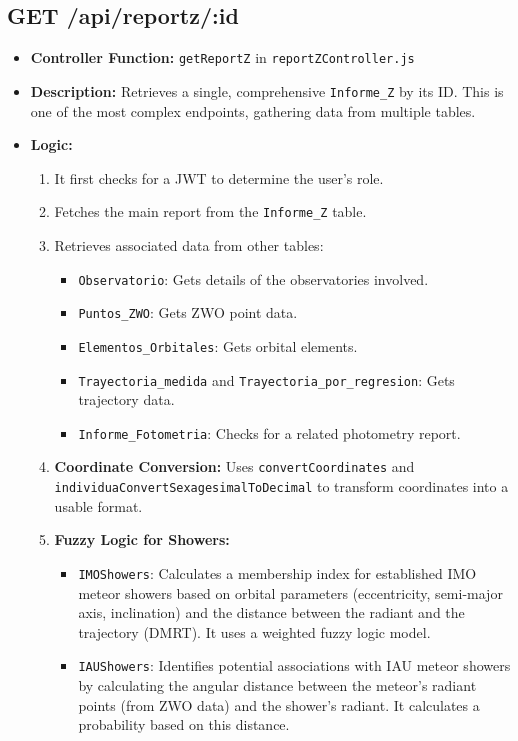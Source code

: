\documentclass{article}
\begin{document}
\subsection{GET /api/reportz/:id}
\begin{itemize}
    \item \textbf{Controller Function:} \texttt{getReportZ} in \texttt{reportZController.js}
    \item \textbf{Description:} Retrieves a single, comprehensive \texttt{Informe\_Z} by its ID. This is one of the most complex endpoints, gathering data from multiple tables.
    \item \textbf{Logic:}
    \begin{enumerate}
        \item It first checks for a JWT to determine the user's role.
        \item Fetches the main report from the \texttt{Informe\_Z} table.
        \item Retrieves associated data from other tables:
        \begin{itemize}
            \item \texttt{Observatorio}: Gets details of the observatories involved.
            \item \texttt{Puntos\_ZWO}: Gets ZWO point data.
            \item \texttt{Elementos\_Orbitales}: Gets orbital elements.
            \item \texttt{Trayectoria\_medida} and \texttt{Trayectoria\_por\_regresion}: Gets trajectory data.
            \item \texttt{Informe\_Fotometria}: Checks for a related photometry report.
        \end{itemize}
        \item \textbf{Coordinate Conversion:} Uses \texttt{convertCoordinates} and \texttt{individuaConvertSexagesimalToDecimal} to transform coordinates into a usable format.
        \item \textbf{Fuzzy Logic for Showers:}
        \begin{itemize}
            \item \texttt{IMOShowers}: Calculates a membership index for established IMO meteor showers based on orbital parameters (eccentricity, semi-major axis, inclination) and the distance between the radiant and the trajectory (DMRT). It uses a weighted fuzzy logic model.
            \item \texttt{IAUShowers}: Identifies potential associations with IAU meteor showers by calculating the angular distance between the meteor's radiant points (from ZWO data) and the shower's radiant. It calculates a probability based on this distance.

\end{itemize}
\end{enumerate}
\end{itemize}
\end{document}
